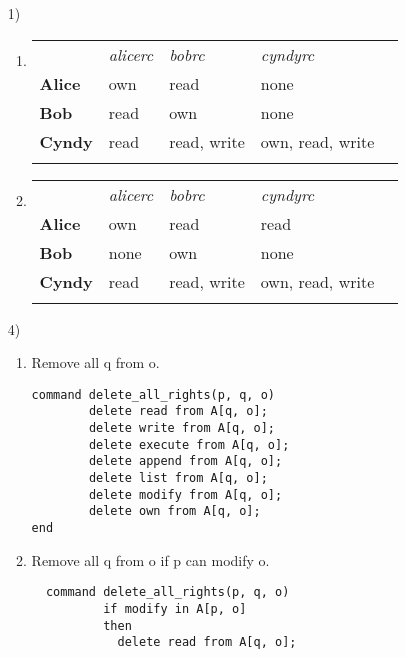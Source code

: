 \documentclass[journal,onecolumn]{IEEEtran}
\begin{document}
\begin{enumerate}
  \item [1)] 
    \begin{enumerate} 
      \item 
        \begin{tabular}{lllll}
                         & \textit{alicerc} & \textit{bobrc} & \textit{cyndyrc} &  \\
          \textbf{Alice} & own              & read           & none             &  \\
          \textbf{Bob}   & read             & own            & none             &  \\
          \textbf{Cyndy} & read             & read, write    & own, read, write &  \\
                         &                  &                &                  & 
        \end{tabular}
      \item 
        \begin{tabular}{lllll}
                         & \textit{alicerc} & \textit{bobrc} & \textit{cyndyrc} &  \\
          \textbf{Alice} & own              & read           & read             &  \\
          \textbf{Bob}   & none             & own            & none             &  \\
          \textbf{Cyndy} & read             & read, write    & own, read, write &  \\
                         &                  &                &                  & 
        \end{tabular}
    \end{enumerate} 
  \item [4)] 
    \begin{enumerate} 
\item Remove all q from o.
\begin{lstlisting}
command delete_all_rights(p, q, o)
        delete read from A[q, o];
        delete write from A[q, o];
        delete execute from A[q, o];
        delete append from A[q, o];
        delete list from A[q, o];
        delete modify from A[q, o];
        delete own from A[q, o];
end
\end{lstlisting}
\item Remove all q from o if p can modify o.
\begin{lstlisting}
  command delete_all_rights(p, q, o)
          if modify in A[p, o]
          then 
            delete read from A[q, o];

\end{lstlisting}
\end{enumerate}
\end{enumerate}
\end{document}
